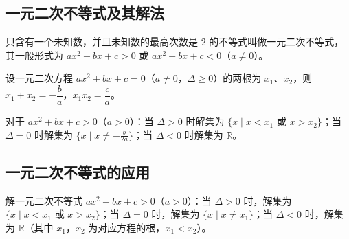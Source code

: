 \subsection{一元二次不等式及其解法}
\begin{definition}[一元二次不等式]
只含有一个未知数，并且未知数的最高次数是 $2$ 的不等式叫做一元二次不等式，其一般形式为 $ax^2+bx+c>0$ 或 $ax^2+bx+c<0$（$a \neq 0$）。
\end{definition}
\begin{theorem}[韦达定理]
设一元二次方程 $ax^2+bx+c=0$（$a \neq 0$，$\Delta \geq 0$）的两根为 $x_1$、$x_2$，则 $x_1+x_2=-\dfrac{b}{a}$，$x_1 x_2=\dfrac{c}{a}$。
\end{theorem}
\begin{corollary}[一元二次不等式的解集与判别式]
对于 $ax^2+bx+c>0$（$a>0$）：当 $\Delta>0$ 时解集为 $\{x \mid x<x_1 \text{ 或 } x>x_2\}$；当 $\Delta=0$ 时解集为 $\{x \mid x \neq -\tfrac{b}{2a}\}$；当 $\Delta<0$ 时解集为 $\mathbb{R}$。
\end{corollary}
\subsection{一元二次不等式的应用}
\begin{definition}[一元二次不等式的解法]
解一元二次不等式 $ax^2+bx+c>0$（$a>0$）：当 $\Delta>0$ 时，解集为 $\{x \mid x<x_1 \text{ 或 } x>x_2\}$；当 $\Delta=0$ 时，解集为 $\{x \mid x \neq x_1\}$；当 $\Delta<0$ 时，解集为 $\mathbb{R}$（其中 $x_1$，$x_2$ 为对应方程的根，$x_1<x_2$）。
\end{definition}
